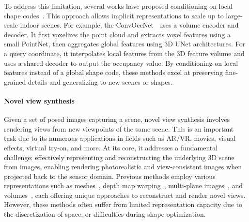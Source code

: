 To address this limitation, several works have proposed conditioning on local shape codes~\cite{peng2020convolutional, jiang2020local, genova2020local, chabra2020deep}. This approach allows implicit representations to scale up to large-scale indoor scenes. For example, the ConvOccNet~\cite{peng2020convolutional} uses a volume encoder and decoder. It first voxelizes the point cloud and extracts voxel features using a small PointNet, then aggregates global features using 3D UNet architectures. For a query coordinate, it interpolates local features from the 3D feature volume and uses a shared decoder to output the occupancy value. By conditioning on local features instead of a global shape code, these methods excel at preserving fine-grained details and generalizing to new scenes or shapes.


\paragraph{Novel view synthesis}
Given a set of posed images capturing a scene, novel view synthesis involves rendering views from new viewpoints of the same scene. This is an important task due to its numerous applications in fields such as AR/VR, movies, visual effects, virtual try-on, and more. At its core, it addresses a fundamental challenge: effectively representing and reconstructing the underlying 3D scene from images, enabling rendering photorealistic and view-consistent images when projected back to the sensor domain. Previous methods employ various representations such as meshes~\cite{buehler2001unstructured,debevec2023modeling}, depth map warping~\cite{chen2023view,shade1998layered}, multi-plane images~\cite{flynn2019deepview,srinivasan2019pushing}, and volumes~\cite{henzler2018single,Lombardi2019,curless1996volumetric}, each offering unique approaches to reconstruct and render novel views. However, these methods often suffer from limited representation capacity due to the discretization of space, or difficulties during shape optimization.

